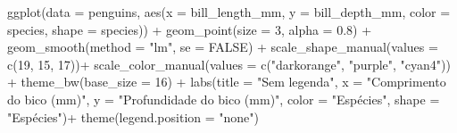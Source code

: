 \documentclass[
]{book}
\newenvironment{Shaded}{\begin{snugshade}}{\end{snugshade}}
\newcommand{\AttributeTok}[1]{\textcolor[rgb]{0.61,0.61,0.61}{#1}}
\newcommand{\ConstantTok}[1]{\textcolor[rgb]{0,0,0}{#1}}
\newcommand{\DecValTok}[1]{\textcolor[rgb]{0.06,0.06,0.06}{#1}}
\newcommand{\FloatTok}[1]{\textcolor[rgb]{0.06,0.06,0.06}{#1}}
\newcommand{\FunctionTok}[1]{\textcolor[rgb]{0,0,0}{#1}}
\newcommand{\NormalTok}[1]{#1}
\newcommand{\SpecialCharTok}[1]{\textcolor[rgb]{0,0,0}{#1}}
\newcommand{\StringTok}[1]{\textcolor[rgb]{0.5,0.5,0.5}{#1}}
\begin{document}
\begin{Shaded}
\begin{Highlighting}[]
\FunctionTok{ggplot}\NormalTok{(}\AttributeTok{data =}\NormalTok{ penguins, }
       \FunctionTok{aes}\NormalTok{(}\AttributeTok{x =}\NormalTok{ bill\_length\_mm, }
           \AttributeTok{y =}\NormalTok{ bill\_depth\_mm,}
           \AttributeTok{color =}\NormalTok{ species,}
           \AttributeTok{shape =}\NormalTok{ species)) }\SpecialCharTok{+}
  \FunctionTok{geom\_point}\NormalTok{(}\AttributeTok{size =} \DecValTok{3}\NormalTok{, }
             \AttributeTok{alpha =} \FloatTok{0.8}\NormalTok{) }\SpecialCharTok{+}
  \FunctionTok{geom\_smooth}\NormalTok{(}\AttributeTok{method =} \StringTok{"lm"}\NormalTok{, }\AttributeTok{se =} \ConstantTok{FALSE}\NormalTok{) }\SpecialCharTok{+}
  \FunctionTok{scale\_shape\_manual}\NormalTok{(}\AttributeTok{values =} \FunctionTok{c}\NormalTok{(}\DecValTok{19}\NormalTok{, }\DecValTok{15}\NormalTok{, }\DecValTok{17}\NormalTok{))}\SpecialCharTok{+}
  \FunctionTok{scale\_color\_manual}\NormalTok{(}\AttributeTok{values =} \FunctionTok{c}\NormalTok{(}\StringTok{"darkorange"}\NormalTok{, }\StringTok{"purple"}\NormalTok{, }\StringTok{"cyan4"}\NormalTok{)) }\SpecialCharTok{+}
  \FunctionTok{theme\_bw}\NormalTok{(}\AttributeTok{base\_size =} \DecValTok{16}\NormalTok{) }\SpecialCharTok{+}
  \FunctionTok{labs}\NormalTok{(}\AttributeTok{title =} \StringTok{"Sem legenda"}\NormalTok{, }\AttributeTok{x =} \StringTok{"Comprimento do bico (mm)"}\NormalTok{, }\AttributeTok{y =} \StringTok{"Profundidade do bico (mm)"}\NormalTok{, }
       \AttributeTok{color =} \StringTok{"Espécies"}\NormalTok{, }\AttributeTok{shape =} \StringTok{"Espécies"}\NormalTok{)}\SpecialCharTok{+}
  \FunctionTok{theme}\NormalTok{(}\AttributeTok{legend.position =} \StringTok{"none"}\NormalTok{)}



\end{Highlighting}
\end{Shaded}
\end{document}
